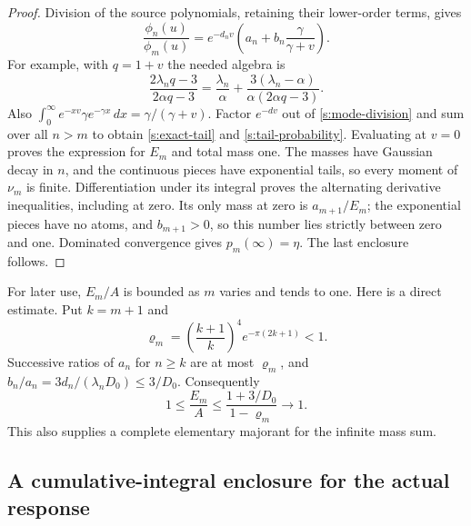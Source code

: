 \begin{proof}
Division of the source polynomials, retaining their lower-order terms,
gives
\begin{equation}
 \frac{\phi_n(u)}{\phi_m(u)}
   =e^{-d_nv}\left(a_n+b_n\frac{\gamma}{\gamma+v}\right).
 \label{s:mode-division}
\end{equation}
For example, with $q=1+v$ the needed algebra is
\[
 \frac{2\lambda_nq-3}{2\alpha q-3}
 =\frac{\lambda_n}{\alpha}
    +\frac{3(\lambda_n-\alpha)}{\alpha(2\alpha q-3)}.
\]
Also $\int_0^\infty e^{-xv}\gamma e^{-\gamma x}\,dx
=\gamma/(\gamma+v)$.  Factor $e^{-dv}$ out of
\eqref{s:mode-division} and sum over all $n>m$ to obtain
\eqref{s:exact-tail} and \eqref{s:tail-probability}.  Evaluating at
$v=0$ proves the expression for $E_m$ and total mass one.  The masses
have Gaussian decay in $n$, and the continuous pieces have exponential
tails, so every moment of $\nu_m$ is finite.  Differentiation under its
integral proves the alternating derivative inequalities, including at
zero.  Its only mass at zero is $a_{m+1}/E_m$; the exponential pieces
have no atoms, and $b_{m+1}>0$, so this number lies strictly between
zero and one.  Dominated convergence gives $p_m(\infty)=\eta$.
The last enclosure follows.
\end{proof}

For later use, $E_m/A$ is bounded as $m$ varies and tends to one.  Here
is a direct estimate.  Put $k=m+1$ and
\[
 \varrho_m=\left(\frac{k+1}{k}\right)^4e^{-\pi(2k+1)}<1.
\]
Successive ratios of $a_n$ for $n\ge k$ are at most $\varrho_m$,
and $b_n/a_n=3d_n/(\lambda_nD_0)\le3/D_0$.  Consequently
\begin{equation}
 1\le\frac{E_m}{A}
 \le\frac{1+3/D_0}{1-\varrho_m}\longrightarrow1.
 \label{s:tail-mass-ratio}
\end{equation}
This also supplies a complete elementary majorant for the infinite
mass sum.

\subsection{A cumulative-integral enclosure for the actual response}

